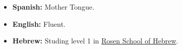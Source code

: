 \documentclass[paper=letter,fontsize=11pt]{scrartcl} %
\newcommand{\NewPart}[2]{\section*{\uppercase{#1} \small \normalfont #2}}
\newcommand{\Text}[1]{\par       
		\noindent \small #1 
		\normalsize \par}
\begin{document}
\begin{itemize}
\item \textbf{Spanish:} Mother Tongue.
\item \textbf{English:} Fluent.
\item \textbf{Hebrew:} Studing level 1 in {\href{https://rosenhebrewschool.com/}{Rosen School of Hebrew}}.
\end{itemize}

\end{document}
